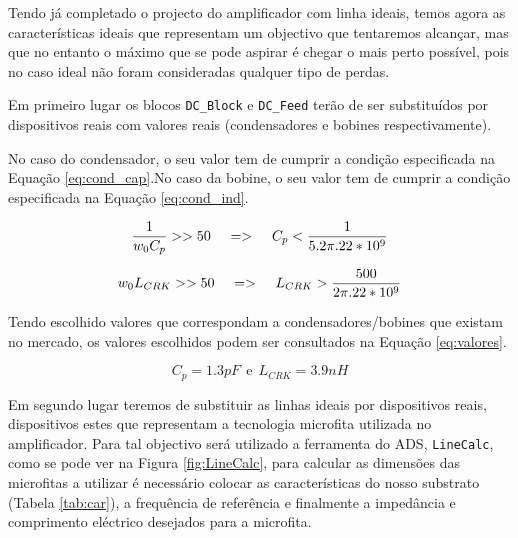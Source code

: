 \documentclass[11pt]{article}
\numberwithin{equation}{section}
\begin{document}
Tendo já completado o projecto do amplificador com linha ideais, temos agora as características ideais que representam um objectivo que tentaremos alcançar, mas que no entanto o máximo que se pode aspirar é chegar o mais perto possível, pois no caso ideal não foram consideradas qualquer tipo de perdas.

Em primeiro lugar os blocos \texttt{DC\_Block} e \texttt{DC\_Feed} terão de ser substituídos por dispositivos reais com valores reais (condensadores e bobines respectivamente). 

No caso do condensador, o seu valor tem de cumprir a condição especificada na Equação \ref{eq:cond_cap}.No caso da bobine, o seu valor tem de cumprir a condição especificada na Equação \ref{eq:cond_ind}.

\begin{equation}
\dfrac{1}{w_{0} C_{p}}>>50 \hspace{4mm} => \hspace{4mm}   C_{p}<\dfrac{1}{5.2 \pi . 22*10^{9}}
\label{eq:cond_cap}
\end{equation}

\begin{equation}
w_{0} L_{CRK}>>50 \hspace{4mm} => \hspace{4mm}   L_{CRK}>\dfrac{500}{2 \pi . 22*10^{9}}
\label{eq:cond_ind}
\end{equation}

Tendo escolhido valores que correspondam a condensadores/bobines que existam no mercado, os valores escolhidos podem ser consultados na Equação \ref{eq:valores}.

\begin{equation}
C_{p} = 1.3 pF ~~ \text{e} ~~ L_{CRK} = 3.9 nH
\label{eq:valores}
\end{equation}

Em segundo lugar teremos de substituir as linhas ideais por dispositivos reais, dispositivos estes que representam a tecnologia microfita utilizada no amplificador. Para tal objectivo será utilizado a ferramenta do ADS, \texttt{LineCalc}, como se pode ver na Figura \ref{fig:LineCalc}, para calcular as dimensões das microfitas a utilizar é necessário colocar as características do nosso substrato (Tabela \ref{tab:car}), a frequência de referência e finalmente a impedância e comprimento eléctrico desejados para a microfita.
\end{document}
